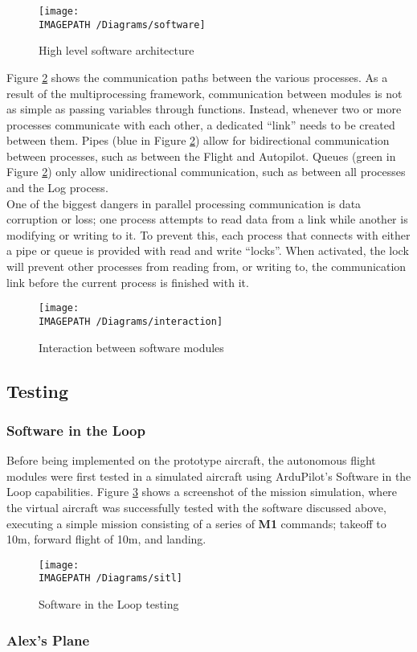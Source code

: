 \begin{figure}[!ht]
	\centering
	\texttt{[image: \\IMAGEPATH /Diagrams/software]}
	\caption{High level software architecture}
	\label{fig:softwarearchitecture}
\end{figure}

Figure \ref{fig:softwareinteraction} shows the communication paths between the various processes. As a result of the multiprocessing framework, communication between modules is not as simple as passing variables through functions. Instead, whenever two or more processes communicate with each other, a dedicated ``link'' needs to be created between them. Pipes (blue in Figure \ref{fig:softwareinteraction}) allow for bidirectional communication between processes, such as between the Flight and Autopilot. Queues (green in Figure \ref{fig:softwareinteraction}) only allow unidirectional communication, such as between all processes and the Log process.\\

One of the biggest dangers in parallel processing communication is data corruption or loss; one process attempts to read data from a link while another is modifying or writing to it. To prevent this, each process that connects with either a pipe or queue is provided with read and write ``locks''. When activated, the lock will prevent other processes from reading from, or writing to, the communication link before the current process is finished with it.

\begin{figure}[H]
	\centering
	\texttt{[image: \\IMAGEPATH /Diagrams/interaction]}
	\caption{Interaction between software modules}
	\label{fig:softwareinteraction}
\end{figure}

\subsection{Testing}
\subsubsection*{Software in the Loop}
Before being implemented on the prototype aircraft, the autonomous flight modules were first tested in a simulated aircraft using ArduPilot's Software in the Loop capabilities\cite{ref:sitl}. Figure \ref{fig:sitl} shows a screenshot of the mission simulation, where the virtual aircraft was successfully tested with the software discussed above, executing a simple mission consisting of a series of \textbf{M1} commands; takeoff to 10m, forward flight of 10m, and landing.

\begin{figure}[H]
	\centering
	\texttt{[image: \\IMAGEPATH /Diagrams/sitl]}
	\caption{Software in the Loop testing}
	\label{fig:sitl}
\end{figure}

\subsubsection*{Alex's Plane}